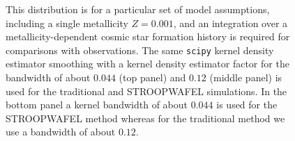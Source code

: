 \documentclass[a4paper,fleqn,usenatbib,useAMS,usedcolumn]{mnras}
\newcommand{\AISs}{\textsc{STROOPWAFEL}}
\begin{document}
\begin{figure}
{    This distribution is for a particular set of model assumptions, including a single metallicity $Z = 0.001$, and an integration over a metallicity-dependent cosmic star formation history is required for comparisons with observations. The same \texttt{scipy} kernel density estimator smoothing with a   kernel density estimator factor for the bandwidth of about $0.044 $ (top panel) and $0.12 $  (middle panel) is  used for the traditional and \AISs{} simulations. In the bottom panel   a  kernel bandwidth  of about $0.044 $ is used for the \AISs{} method whereas for the traditional  method we use a bandwidth of about $0.12$.  }
    \label{fig:MchirpBandwidths}
\end{figure}
%







\bsp	%
\label{lastpage}
\end{document}
